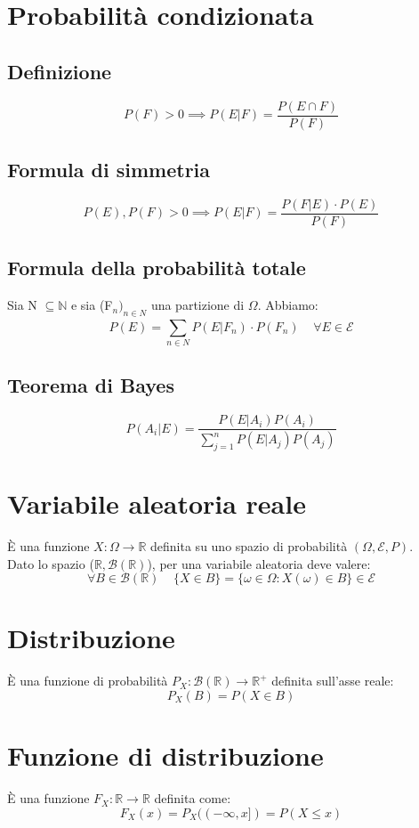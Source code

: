 \documentclass{article}
\begin{document}
\section*{Probabilità condizionata}
\subsection*{Definizione}
\[ P(F) > 0 \implies P(E|F) = \frac{P(E\cap F)}{P(F)} \]

\subsection*{Formula di simmetria}
\[ P(E), P(F) > 0 \implies P(E|F) = \frac{P(F|E)\cdot P(E)}{P(F)} \]

\subsection*{Formula della probabilità totale}
Sia N $\subseteq \mathbb{N}$ e sia (F$_{n})_{n \in N}$ una partizione di $\Omega$. Abbiamo:
\[ P(E) = \sum_{n \in N}^{}P(E|F_{n})\cdot P(F_{n}) \; \; \; \; \forall E \in \mathcal{E} \]

\subsection*{Teorema di Bayes}
\[ P(A_{i}|E) = \frac{P(E|A_{i})P(A_{i})}{\sum_{j=1}^{n}P(E|A_{j})P(A_{j})} \]

\section*{Variabile aleatoria reale}
\`E una funzione $X: \Omega \to \mathbb{R}$ definita su uno spazio di probabilità $(\Omega, \mathcal{E}, P)$.\\
Dato lo spazio ($\mathbb{R}, \mathcal{B}(\mathbb{R})$), per una variabile aleatoria deve valere:
\[ \forall B \in \mathcal{B}(\mathbb{R}) \; \; \; \; \{X \in B\} = \{\omega \in \Omega : X(\omega) \in B\} \in \mathcal{E} \]

\section*{Distribuzione}
\`E una funzione di probabilità $P_{X}: \mathcal{B}(\mathbb{R}) \to \mathbb{R}^+$ definita sull'asse reale:
\[ P_{X}(B) = P(X \in B) \]

\section*{Funzione di distribuzione}
\`E una funzione $F_{X}: \mathbb{R} \to \mathbb{R}$ definita come:
\[ F_{X}(x) = P_{X}((-\infty, x]) = P(X \leq x) \]
\end{document}
